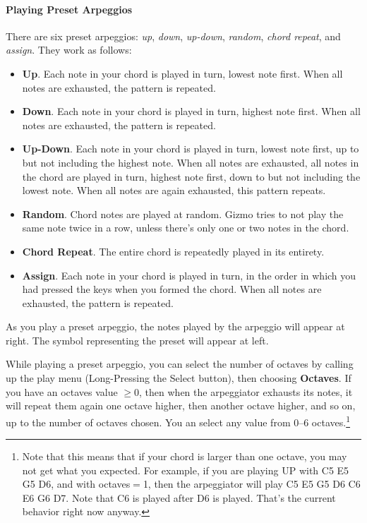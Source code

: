 \documentclass{article}
\begin{document}
\paragraph{Playing Preset Arpeggios}

There are six preset arpeggios: {\it up}, {\it down}, {\it up-down}, {\it random}, {\it chord repeat}, and {\it assign}.  They work as follows:

\begin{itemize}
\item {\bf Up}.  Each note in your chord is played in turn, lowest note first.  When all notes are exhausted, the pattern is repeated.
\item {\bf Down}.  Each note in your chord is played in turn, highest note first.  When all notes are exhausted, the pattern is repeated.
\item {\bf Up-Down}.  Each note in your chord is played in turn, lowest note first, up to but not including the highest note.  When all notes are exhausted, all notes in the chord are played in turn, highest note first, down to but not including the lowest note.  When all notes are again exhausted, this pattern repeats.

\item {\bf Random}.  Chord notes are played at random.  Gizmo tries to not play the same note twice in a row, unless there's only one or two notes in the chord.
\item {\bf Chord Repeat}.  The entire chord is repeatedly played in its entirety.
\item {\bf Assign}. Each note in your chord is played in turn, in the order in which you had pressed the keys when you formed the chord.  When all notes are exhausted, the pattern is repeated.
\end{itemize}

As you play a preset arpeggio, the notes played by the arpeggio will appear at right.  The symbol representing the preset will appear at left.

While playing a preset arpeggio, you can select the number of octaves by calling up the play menu (Long-Pressing the Select button), then choosing {\bf Octaves}.  If you have an octaves value \(\geq 0\), then when the arpeggiator exhausts its notes, it will repeat them again one octave higher, then another octave higher, and so on, up to the number of octaves chosen. You an select any value from 0--6 octaves.\footnote{Note that this means that if your chord is larger than one octave, you may not get what you expected.  For example, if you are playing UP with C5 E5 G5 D6, and with octaves\(=\)1, then the arpeggiator will play C5 E5 G5 D6 C6 E6 G6 D7.  Note that C6 is played after D6 is played.  That's the current behavior right now anyway.}
\end{document}
